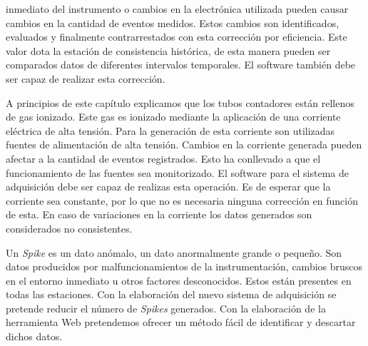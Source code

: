 \begin{description}[leftmargin=0cm]
			inmediato del instrumento o cambios en la electrónica utilizada pueden causar cambios en la cantidad de eventos medidos. Estos
			cambios son identificados, evaluados y finalmente contrarrestados con esta corrección por eficiencia. Este valor dota la
			estación de consistencia histórica, de esta manera pueden ser comparados datos de diferentes intervalos temporales. El
			software también debe ser capaz de realizar esta corrección. 
		\item[Fuentes de alta tensión]
			A principios de este capítulo explicamos que los tubos contadores están rellenos de gas ionizado. Este gas es ionizado
			mediante la aplicación de una corriente eléctrica de alta tensión. Para la generación de esta corriente son utilizadas fuentes
			de alimentación de alta tensión. Cambios en la corriente generada pueden afectar a la cantidad de eventos registrados. Esto ha
			conllevado a que el funcionamiento de las fuentes sea monitorizado. El software para el sistema de adquisición debe ser capaz
			de realizas esta operación. Es de esperar que la corriente sea constante, por lo que no es necesaria ninguna corrección en
			función de esta. En caso de variaciones en la corriente los datos generados son considerados no consistentes.
		\item[\emph{Spikes}]
			Un \emph{Spike} es un dato anómalo, un dato anormalmente grande o pequeño. Son datos producidos por malfuncionamientos de la
			instrumentación, cambios bruscos en el entorno inmediato u otros factores desconocidos. Estos están presentes en todas las
			estaciones. Con la elaboración del nuevo sistema de adquisición se pretende reducir el número de \emph{Spikes} generados. Con
			la elaboración de la herramienta Web pretendemos ofrecer un método fácil de identificar y descartar dichos datos.
	\end{description}
